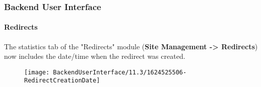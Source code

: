 %

\begin{frame}[fragile]
	\frametitle{Backend User Interface}
	\framesubtitle{Redirects}

	The statistics tab of the "Redirects" module (\textbf{Site Management -> Redirects})
	now includes the date/time when the redirect was created.

	\begin{figure}
		\texttt{[image: BackendUserInterface/11.3/1624525506-RedirectCreationDate]}
	\end{figure}

\end{frame}

